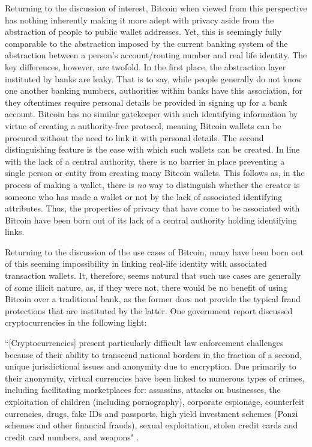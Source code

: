 \documentclass{article}
\begin{document}
Returning to the discussion of interest, Bitcoin when viewed from this perspective has nothing inherently making it more adept with privacy aside from the abstraction of people to public wallet addresses. Yet, this is seemingly fully comparable to the abstraction imposed by the current banking system of the abstraction between a person's account/routing number and real life identity. The key differences, however, are twofold. In the first place, the abstraction layer instituted by banks are leaky. That is to say, while people generally do not know one another banking numbers, authorities within banks have this association, for they oftentimes require personal details be provided in signing up for a bank account. Bitcoin has no similar gatekeeper with such identifying information by virtue of creating a authority-free protocol, meaning Bitcoin wallets can be procured without the need to link it with personal details. The second distinguishing feature is the ease with which such wallets can be created. In line with the lack of a central authority, there is no barrier in place preventing a single person or entity from creating many Bitcoin wallets. This follows as, in the process of making a wallet, there is \textit{no} way to distinguish whether the creator is someone who has made a wallet or not by the lack of associated identifying attributes. Thus, the properties of privacy that have come to be associated with Bitcoin have been born out of its lack of a central authority holding identifying links. 

Returning to the discussion of the use cases of Bitcoin, many have been born out of this seeming impossibility in linking real-life identity with associated transaction wallets. It, therefore, seems natural that such use cases are generally of some illicit nature, as, if they were not, there would be no benefit of using Bitcoin over a traditional bank, as the former does not provide the typical fraud protections that are instituted by the latter. One government report discussed cryptocurrencies in the following light:

``[Cryptocurrencies] present particularly difficult law enforcement challenges because of their ability to transcend national borders in the fraction of a second, unique jurisdictional issues and anonymity due to encryption. Due primarily to their anonymity, virtual currencies have been linked to numerous types of crimes, including facilitating marketplaces for: assassins, attacks on businesses, the exploitation of children (including pornography), corporate espionage, counterfeit currencies, drugs, fake IDs and passports, high yield investment schemes (Ponzi schemes and other financial frauds), sexual exploitation, stolen credit cards and credit card numbers, and weapons" \cite{virtual-currency}. 
\end{document}
